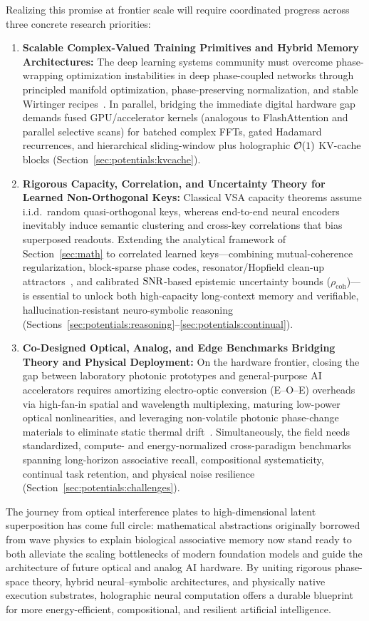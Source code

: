 Realizing this promise at frontier scale will require coordinated progress across three concrete research priorities:
\begin{enumerate}
    \item \textbf{Scalable Complex-Valued Training Primitives and Hybrid Memory Architectures:}
    The deep learning systems community must overcome phase-wrapping optimization instabilities in deep phase-coupled networks through principled manifold optimization, phase-preserving normalization, and stable Wirtinger recipes~\cite{BASSEY_CVNN_SURVEY,TRABELSI_2018_DCN}. In parallel, bridging the immediate digital hardware gap demands fused GPU/accelerator kernels (analogous to FlashAttention and parallel selective scans) for batched complex FFTs, gated Hadamard recurrences, and hierarchical sliding-window plus holographic $\mathcal{O}\!\left(1\right)$ KV-cache blocks (Section~\ref{sec:potentials:kvcache}).
    \item \textbf{Rigorous Capacity, Correlation, and Uncertainty Theory for Learned Non-Orthogonal Keys:}
    Classical VSA capacity theorems assume i.i.d.\ random quasi-orthogonal keys, whereas end-to-end neural encoders inevitably induce semantic clustering and cross-key correlations that bias superposed readouts. Extending the analytical framework of Section~\ref{sec:math} to correlated learned keys---combining mutual-coherence regularization, block-sparse phase codes, resonator/Hopfield clean-up attractors~\cite{FRADY_2020_RESONATOR,RAMSAUER_MODERN_HOPFIELD}, and calibrated $\mathrm{SNR}$-based epistemic uncertainty bounds ($\rho_{\mathrm{coh}}$)---is essential to unlock both high-capacity long-context memory and verifiable, hallucination-resistant neuro-symbolic reasoning (Sections~\ref{sec:potentials:reasoning}--\ref{sec:potentials:continual}).
    \item \textbf{Co-Designed Optical, Analog, and Edge Benchmarks Bridging Theory and Physical Deployment:}
    On the hardware frontier, closing the gap between laboratory photonic prototypes and general-purpose AI accelerators requires amortizing electro-optic conversion (E--O--E) overheads via high-fan-in spatial and wavelength multiplexing, maturing low-power optical nonlinearities, and leveraging non-volatile photonic phase-change materials to eliminate static thermal drift~\cite{WETZSTEIN_2020_OPTICAL_AI,MCMAHON_2023_PHYSICS_OPTICAL_NN}. Simultaneously, the field needs standardized, compute- and energy-normalized cross-paradigm benchmarks spanning long-horizon associative recall, compositional systematicity, continual task retention, and physical noise resilience (Section~\ref{sec:potentials:challenges}).
\end{enumerate}

The journey from optical interference plates to high-dimensional latent superposition has come full circle: mathematical abstractions originally borrowed from wave physics to explain biological associative memory now stand ready to both alleviate the scaling bottlenecks of modern foundation models and guide the architecture of future optical and analog AI hardware.
By uniting rigorous phase-space theory, hybrid neural--symbolic architectures, and physically native execution substrates, holographic neural computation offers a durable blueprint for more energy-efficient, compositional, and resilient artificial intelligence.
